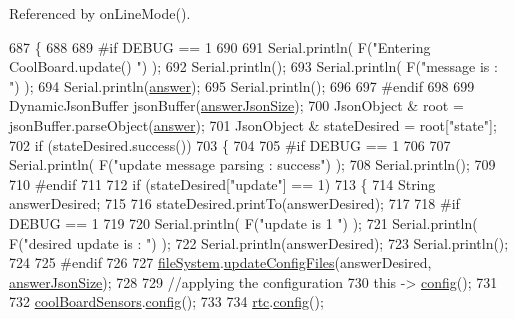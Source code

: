Referenced by on\+Line\+Mode().


\begin{DoxyCode}
687 \{
688 
689 \textcolor{preprocessor}{#if DEBUG == 1}
690 
691     Serial.println( F(\textcolor{stringliteral}{"Entering CoolBoard.update() "}) );
692     Serial.println();
693     Serial.println( F(\textcolor{stringliteral}{"message is : "}) );
694     Serial.println(\hyperlink{classCoolBoard_a7b835fafd449e5282f7f91d787a2dc15}{answer});
695     Serial.println();
696 
697 \textcolor{preprocessor}{#endif}
698 
699     DynamicJsonBuffer jsonBuffer(\hyperlink{classCoolBoard_af2da1f85315b3d074a8b87d158094fb7}{answerJsonSize});
700     JsonObject & root = jsonBuffer.parseObject(\hyperlink{classCoolBoard_a7b835fafd449e5282f7f91d787a2dc15}{answer});
701     JsonObject & stateDesired = root[\textcolor{stringliteral}{"state"}];
702     \textcolor{keywordflow}{if} (stateDesired.success())
703     \{
704     
705 \textcolor{preprocessor}{    #if DEBUG == 1}
706 
707         Serial.println( F(\textcolor{stringliteral}{"update message parsing : success"}) );
708         Serial.println();
709     
710 \textcolor{preprocessor}{    #endif}
711 
712         \textcolor{keywordflow}{if} (stateDesired[\textcolor{stringliteral}{"update"}] == 1)
713         \{
714             String answerDesired;
715         
716             stateDesired.printTo(answerDesired);
717             
718 \textcolor{preprocessor}{        #if DEBUG == 1      }
719         
720             Serial.println( F(\textcolor{stringliteral}{"update is 1 "}) );
721             Serial.println( F(\textcolor{stringliteral}{"desired update is : "}) );            
722             Serial.println(answerDesired);
723             Serial.println();
724         
725 \textcolor{preprocessor}{        #endif}
726             
727             \hyperlink{classCoolBoard_a42c2586fbb13ff7f06538e9284e8538d}{fileSystem}.\hyperlink{classCoolFileSystem_a32dad79ae80182a83e2e8f52286b7c7b}{updateConfigFiles}(answerDesired, 
      \hyperlink{classCoolBoard_af2da1f85315b3d074a8b87d158094fb7}{answerJsonSize});
728 
729             \textcolor{comment}{//applying the configuration    }
730             \textcolor{keyword}{this} -> \hyperlink{classCoolBoard_a583a874c09c07e70a6eb9229fc4beddb}{config}();
731 
732             \hyperlink{classCoolBoard_af102be5288bd7f7a8e59b13f86e26a00}{coolBoardSensors}.\hyperlink{classCoolBoardSensors_a9a218895c5423375c33c08f2c56fb23a}{config}();
733 
734             \hyperlink{classCoolBoard_a50d2a6716879d64a85f3c6b44ad63275}{rtc}.\hyperlink{classCoolTime_a87c28260c1bc77091162cbcf1ee2e129}{config}();

\end{DoxyCode}
